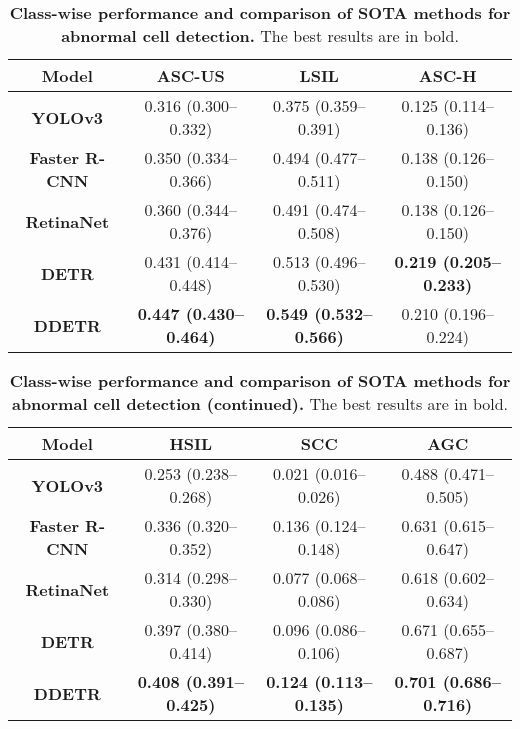 \begin{table}[h] 
\renewcommand{\arraystretch}{1.5}
\renewcommand{\tablename}{Extended Data Table.}
\centering 
\caption{\textbf{Class-wise performance and comparison of SOTA methods for abnormal cell detection.} The best results are in bold.}
    \begin{tabular}{c|ccc}
    \hline
    \rowcolor{cusyellow} \textbf{Model} & \textbf{ASC-US} & \textbf{LSIL} & \textbf{ASC-H} \\ 
    \hline
    \textbf{YOLOv3} & 0.316 (0.300–0.332) & 0.375 (0.359–0.391) & 0.125 (0.114–0.136) \\ 
    \rowcolor{cusyellowl} \textbf{Faster R-CNN} & 0.350 (0.334–0.366) & 0.494 (0.477–0.511) & 0.138 (0.126–0.150) \\ 
    \textbf{RetinaNet} & 0.360 (0.344–0.376) & 0.491 (0.474–0.508) & 0.138 (0.126–0.150) \\ 
    \rowcolor{cusyellowl} \textbf{DETR} & 0.431 (0.414–0.448) & 0.513 (0.496–0.530) & \textbf{0.219 (0.205–0.233)} \\ 
    \textbf{DDETR} & \textbf{0.447 (0.430–0.464)} & \textbf{0.549 (0.532–0.566)} & 0.210 (0.196–0.224) \\ 
    \hline
\end{tabular}
\label{ST_det_p1}
\end{table}

\begin{table}[h] 
\renewcommand{\arraystretch}{1.5}
\renewcommand{\tablename}{Extended Data Table.}
\centering 
\caption{\textbf{Class-wise performance and comparison of SOTA methods for abnormal cell detection (continued).} The best results are in bold.}
    \begin{tabular}{c|ccc}
    \hline
    \rowcolor{cusyellow} \textbf{Model} & \textbf{HSIL} & \textbf{SCC} & \textbf{AGC} \\ 
    \hline
    \textbf{YOLOv3} & 0.253 (0.238–0.268) & 0.021 (0.016–0.026) & 0.488 (0.471–0.505) \\ 
    \rowcolor{cusyellowl} \textbf{Faster R-CNN} & 0.336 (0.320–0.352) & 0.136 (0.124–0.148) & 0.631 (0.615–0.647) \\ 
    \textbf{RetinaNet} & 0.314 (0.298–0.330) & 0.077 (0.068–0.086) & 0.618 (0.602–0.634) \\ 
    \rowcolor{cusyellowl} \textbf{DETR} & 0.397 (0.380–0.414) & 0.096 (0.086–0.106) & 0.671 (0.655–0.687) \\ 
    \textbf{DDETR} & \textbf{0.408 (0.391–0.425)} & \textbf{0.124 (0.113–0.135)} & \textbf{0.701 (0.686–0.716)} \\ 
    \hline
\end{tabular}
\label{ST_det_p2}
\end{table}

